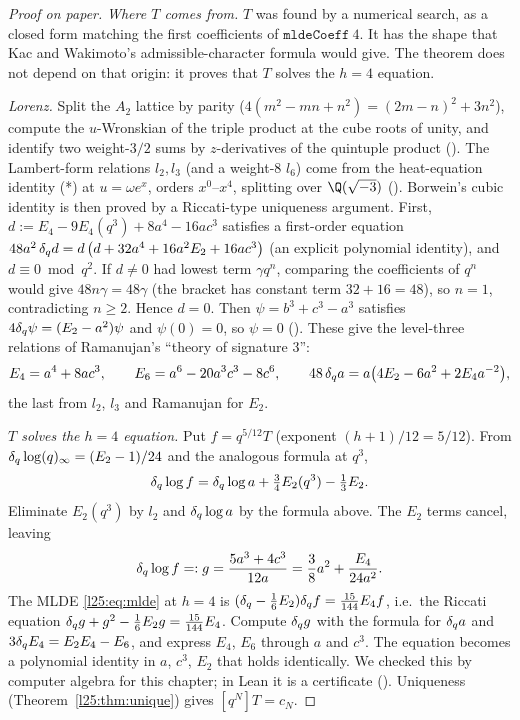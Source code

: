 \begin{proof}[Proof on paper]
\emph{Where $T$ comes from.} $T$ was found by a numerical search, as a closed form matching the first coefficients of
$\mathtt{mldeCoeff}\ 4$. It has the shape that Kac and Wakimoto's admissible-character formula would give. The theorem
does not depend on that origin: it proves that $T$ solves the $h=4$ equation.

\emph{Lorenz.} Split the $A_2$ lattice by parity ($4(m^2-mn+n^2)=(2m-n)^2+3n^2$), compute the $u$-Wronskian of the triple
product at the cube roots of unity, and identify two weight-$3/2$ sums by $z$-derivatives of the quintuple product
(). The Lambert-form relations $l_2,l_3$ (and a weight-8 $l_6$) come from the heat-equation identity
(*) at $u=\omega e^x$, orders $x^0$--$x^4$, splitting over $\Q(\sqrt{-3})$ (). Borwein's
cubic identity is then proved by a Riccati-type uniqueness argument. First, $d:=E_4-9E_4(q^3)+8a^4-16ac^3$ satisfies a
first-order equation $48a^2\,\delta_q d=d\,\big(d+32a^4+16a^2E_2+16ac^3\big)$ (an explicit polynomial identity),
and $d\equiv0\bmod q^2$. If $d\ne0$ had lowest term $\gamma q^n$, comparing the coefficients of $q^n$ would give
$48n\gamma=48\gamma$ (the bracket has constant term $32+16=48$), so $n=1$, contradicting $n\ge2$. Hence $d=0$. Then
$\psi=b^3+c^3-a^3$ satisfies $4\delta_q\psi=(E_2-a^2)\psi$ and $\psi(0)=0$, so $\psi=0$ ().
These give the level-three relations of Ramanujan's ``theory of signature 3'':
\begin{equation*}
E_4=a^4+8ac^3,\qquad E_6=a^6-20a^3c^3-8c^6,\qquad 48\,\delta_q a=a\big(4E_2-6a^2+2E_4a^{-2}\big),
\end{equation*}
the last from $l_2$, $l_3$ and Ramanujan for $E_2$.

\emph{$T$ solves the $h=4$ equation.} Put $f=q^{5/12}T$ (exponent $(h+1)/12=5/12$). From
$\delta_q\log(q)_\infty=(E_2-1)/24$ and the analogous formula at $q^3$,
\begin{equation*}
\delta_q\log f=\delta_q\log a+\tfrac34E_2(q^3)-\tfrac13E_2 .
\end{equation*}
Eliminate $E_2(q^3)$ by $l_2$ and $\delta_q\log a$ by the formula above. The $E_2$ terms cancel, leaving
\begin{equation*}
\delta_q\log f=:g=\frac{5a^3+4c^3}{12a}=\frac38a^2+\frac{E_4}{24a^2}.
\end{equation*}
The MLDE \eqref{l25:eq:mlde} at $h=4$ is $(\delta_q-\frac16E_2)\delta_q f=\frac{15}{144}E_4f$, i.e.\ the Riccati
equation $\delta_q g+g^2-\frac16E_2g=\frac{15}{144}E_4$. Compute $\delta_q g$ with the formula for
$\delta_q a$ and $3\delta_q E_4=E_2E_4-E_6$, and express $E_4$, $E_6$ through $a$ and $c^3$. The equation
becomes a polynomial identity in $a$, $c^3$, $E_2$ that holds identically. We checked this by computer algebra for this
chapter; in Lean it is a  certificate (). Uniqueness
(Theorem~\ref{l25:thm:unique}) gives $[q^N]T=c_N$.
\end{proof}

